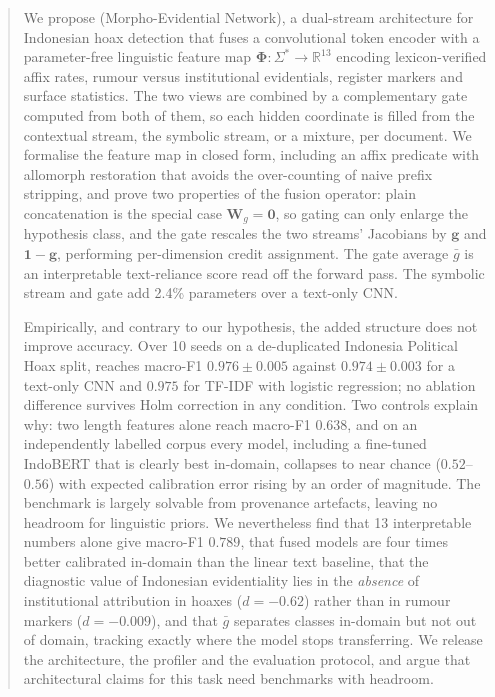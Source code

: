 \begin{abstract}
We propose \menet{} (Morpho-Evidential Network), a dual-stream architecture for Indonesian hoax detection
that fuses a convolutional token encoder with a parameter-free linguistic feature map
$\bm{\Phi}:\Sigma^{*}\to\mathbb{R}^{13}$ encoding lexicon-verified affix rates, rumour versus institutional
evidentials, register markers and surface statistics. The two views are combined by a complementary gate
computed from both of them, so each hidden coordinate is filled from the contextual stream, the symbolic
stream, or a mixture, per document. We formalise the feature map in closed form, including an affix
predicate with allomorph restoration that avoids the over-counting of naive prefix stripping, and prove
two properties of the fusion operator: plain concatenation is the special case $\mathbf{W}_g=\mathbf{0}$,
so gating can only enlarge the hypothesis class, and the gate rescales the two streams' Jacobians by
$\mathbf{g}$ and $\mathbf{1}-\mathbf{g}$, performing per-dimension credit assignment. The gate average
$\bar g$ is an interpretable text-reliance score read off the forward pass. The symbolic stream and gate
add 2.4\% parameters over a text-only CNN.

Empirically, and contrary to our hypothesis, the added structure does not improve accuracy. Over 10 seeds
on a de-duplicated Indonesia Political Hoax split, \menet{} reaches macro-F1 $0.976{\pm}0.005$ against
$0.974{\pm}0.003$ for a text-only CNN and $0.975$ for TF-IDF with logistic regression; no ablation
difference survives Holm correction in any condition. Two controls explain why: two length features alone
reach macro-F1 $0.638$, and on an independently labelled corpus every model, including a fine-tuned
IndoBERT that is clearly best in-domain, collapses to near chance ($0.52$--$0.56$) with expected
calibration error rising by an order of magnitude. The benchmark is largely solvable from provenance
artefacts, leaving no headroom for linguistic priors. We nevertheless find that 13 interpretable
numbers alone give macro-F1 $0.789$, that fused models are four times better calibrated in-domain than the
linear text baseline, that the diagnostic value of Indonesian evidentiality lies in the \emph{absence} of
institutional attribution in hoaxes ($d=-0.62$) rather than in rumour markers ($d=-0.009$), and that
$\bar g$ separates classes in-domain but not out of domain, tracking exactly where the model stops
transferring. We release the architecture, the profiler and the evaluation protocol, and argue that
architectural claims for this task need benchmarks with headroom.
\end{abstract}
